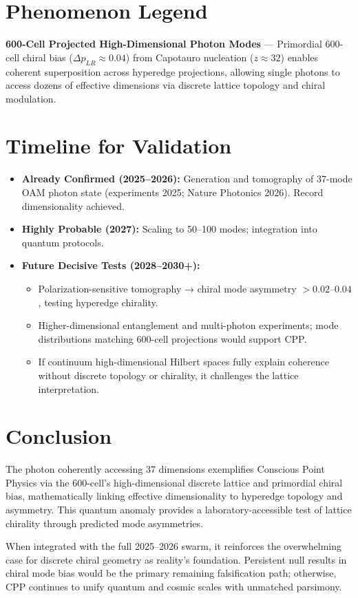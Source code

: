\documentclass[11pt]{article}
\begin{document}
\section{Phenomenon Legend}
\textbf{600-Cell Projected High-Dimensional Photon Modes} — Primordial 600-cell chiral bias ($\Delta p_{LR} \approx 0.04$) from Capotauro nucleation ($z \approx 32$) enables coherent superposition across hyperedge projections, allowing single photons to access dozens of effective dimensions via discrete lattice topology and chiral modulation.

\section{Timeline for Validation}
\begin{itemize}
    \item \textbf{Already Confirmed (2025--2026):} Generation and tomography of 37-mode OAM photon state (experiments 2025; Nature Photonics 2026). Record dimensionality achieved.
    \item \textbf{Highly Probable (2027):} Scaling to 50--100 modes; integration into quantum protocols.
    \item \textbf{Future Decisive Tests (2028--2030+):}
    \begin{itemize}
        \item Polarization-sensitive tomography → chiral mode asymmetry $>0.02$--$0.04$, testing hyperedge chirality.
        \item Higher-dimensional entanglement and multi-photon experiments; mode distributions matching 600-cell projections would support CPP.
        \item If continuum high-dimensional Hilbert spaces fully explain coherence without discrete topology or chirality, it challenges the lattice interpretation.
    \end{itemize}
\end{itemize}

\section{Conclusion}
The photon coherently accessing 37 dimensions exemplifies Conscious Point Physics via the 600-cell's high-dimensional discrete lattice and primordial chiral bias, mathematically linking effective dimensionality to hyperedge topology and asymmetry. This quantum anomaly provides a laboratory-accessible test of lattice chirality through predicted mode asymmetries.  

When integrated with the full 2025--2026 swarm, it reinforces the overwhelming case for discrete chiral geometry as reality's foundation. Persistent null results in chiral mode bias would be the primary remaining falsification path; otherwise, CPP continues to unify quantum and cosmic scales with unmatched parsimony.
\end{document}

